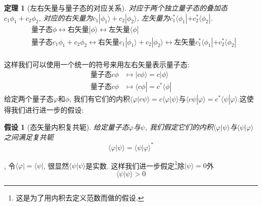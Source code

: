 \documentclass[a4paper,11pt]{article}
\newtheorem{theorem}{\hspace{2em}定理}[section]
\newtheorem{hypothesis}{假设}[section]
\begin{document}
\begin{theorem}[左右矢量与量子态的对应关系]
  对应于两个独立量子态的叠加态$c_1\phi_1+c_2\phi_2$, 对应的右矢量为$c_1|\phi_1\rangle+c_2|\phi_2\rangle$, 左矢量为$c_1^*\langle\phi_1|+c_2^*\langle\phi_2|$.
\begin{equation*}
  \begin{split}
     &\text{量子态}\phi\longleftrightarrow\text{右矢量}|\phi\rangle\longleftrightarrow\text{左矢量}\langle\phi|\\
     &\text{量子态}c_1\phi_1+c_2\phi_2\longleftrightarrow\text{右矢量}c_1|\phi_1\rangle+c_2|\phi_2\rangle\longleftrightarrow\text{左矢量}c_1^*\langle\phi_1|+c_2^*\langle\phi_2|\\
  \end{split}
\end{equation*}
\end{theorem}
这样我们可以使用一个统一的符号来用左右矢量表示量子态:
\begin{equation*}
  \begin{split}
     \text{量子态}c\phi & \longmapsto|c\phi\rangle=c|\phi\rangle \\
     \text{量子态}c\phi & \longmapsto\langle c\phi|=c^*\langle\phi|
  \end{split}
\end{equation*}
给定两个量子态$\varphi$和$\phi$, 我们有它们的内积$\langle\varphi|c\psi\rangle=c\langle\varphi|\psi\rangle$与$\langle c\psi|\varphi\rangle=c^*\langle\psi|\varphi\rangle$.这使得我们进行进一步的假设:
\begin{hypothesis}[态矢量内积复共轭]
给定量子态$\varphi$与$\psi$, 我们假定它们的内积$\langle\varphi|\psi\rangle$与$\langle\psi|\varphi\rangle$之间满足复共轭
\begin{equation*}
  \langle\varphi|\psi\rangle=\langle\psi|\varphi\rangle^*
\end{equation*}
\end{hypothesis}
, 令$\langle\varphi|=\langle\psi|$, 很显然$\langle\psi|\psi\rangle$是实数. 这样我们进一步假定\footnote{这是为了用内积去定义范数而做的假设.}除$|\psi\rangle=0$外
\begin{equation}\label{braket proper}
  \langle\psi|\psi\rangle>0
\end{equation}
\end{document}
